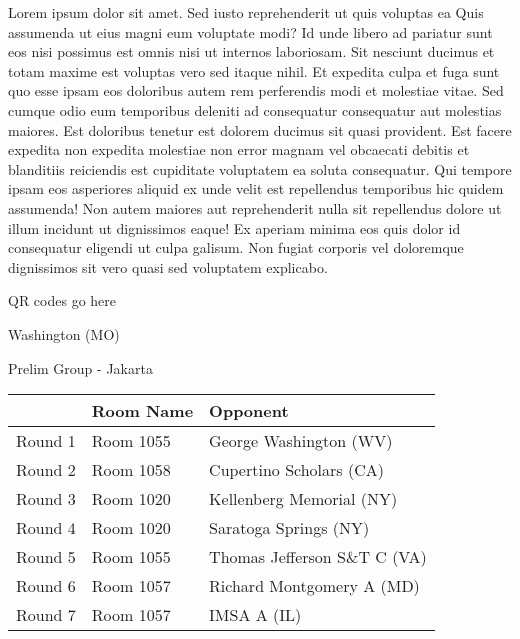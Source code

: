 \documentclass{article}%
\begin{document}
\vspace*{8pt}%
\linebreak%
\newline%
\newline%
Lorem ipsum dolor sit amet. Sed iusto reprehenderit ut quis voluptas ea Quis assumenda ut eius magni eum voluptate modi? Id unde libero ad pariatur sunt eos nisi possimus est omnis nisi ut internos laboriosam. Sit nesciunt ducimus et totam maxime est voluptas vero sed itaque nihil. Et expedita culpa et fuga sunt quo esse ipsam eos doloribus autem rem perferendis modi et molestiae vitae.\newline%
\newline%
Sed cumque odio eum temporibus deleniti ad consequatur consequatur aut molestias maiores. Est doloribus tenetur est dolorem ducimus sit quasi provident. Est facere expedita non expedita molestiae non error magnam vel obcaecati debitis et blanditiis reiciendis est cupiditate voluptatem ea soluta consequatur. Qui tempore ipsam eos asperiores aliquid ex unde velit est repellendus temporibus hic quidem assumenda!\newline%
\newline%
Non autem maiores aut reprehenderit nulla sit repellendus dolore ut illum incidunt ut dignissimos eaque! Ex aperiam minima eos quis dolor id consequatur eligendi ut culpa galisum. Non fugiat corporis vel doloremque dignissimos sit vero quasi sed voluptatem explicabo.\newline%
\newline%
%
\vspace*{30pt}%
\begin{center}%
\begin{Huge}%
QR codes go here%
\end{Huge}%
\end{center}%
\newpage%
%
\begin{center}%
\begin{Huge}%
Washington (MO)%
\end{Huge}%
\vspace*{8pt}%
\linebreak%
\begin{Large}%
Prelim Group {-} Jakarta%
\end{Large}%
\end{center}%
\begin{tabularx}{\textwidth}{|c|Y|Y|}%
\hline%
&Room Name&Opponent\\%
\hline%
Round 1&Room 1055&George Washington (WV)\\%
Round 2&Room 1058&Cupertino Scholars (CA)\\%
Round 3&Room 1020&Kellenberg Memorial (NY)\\%
Round 4&Room 1020&Saratoga Springs (NY)\\%
Round 5&Room 1055&Thomas Jefferson S\&T C (VA)\\%
Round 6&Room 1057&Richard Montgomery A (MD)\\%
Round 7&Room 1057&IMSA A (IL)\\%
\hline%
\end{tabularx}%
\end{document}
